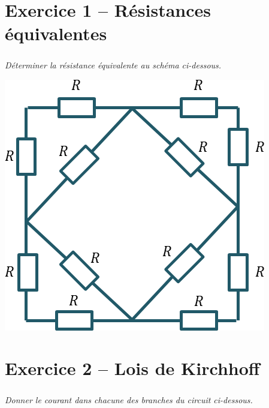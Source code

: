 \documentclass[10pt,fleqn]{book} %
\begin{document}

\vspace{7cm}
\pagestyle{fancy}
\thispagestyle{plain}


\def\columnseprulecolor{\color{ocre}}
\setlength{\columnseprule}{0.4pt} 
\begin{multicols}{2}

\section*{Exercice 1 -- Résistances équivalentes}

\subparagraph{}
\textit{Déterminer la résistance équivalente au schéma ci-dessous.}

\ifprof
\begin{corrige}

\end{corrige}
\else
\fi

\begin{center}
\includegraphics[width=.6\linewidth]{images/fig_03}
\end{center}

\section*{Exercice 2 -- Lois  de Kirchhoff}
\setcounter{subparagraph}{0}

\subparagraph{}
\textit{Donner le courant dans chacune des branches du circuit ci-dessous.}

\ifprof
\begin{corrige}

\end{corrige}
\else
\fi


\end{multicols}
\end{document}
